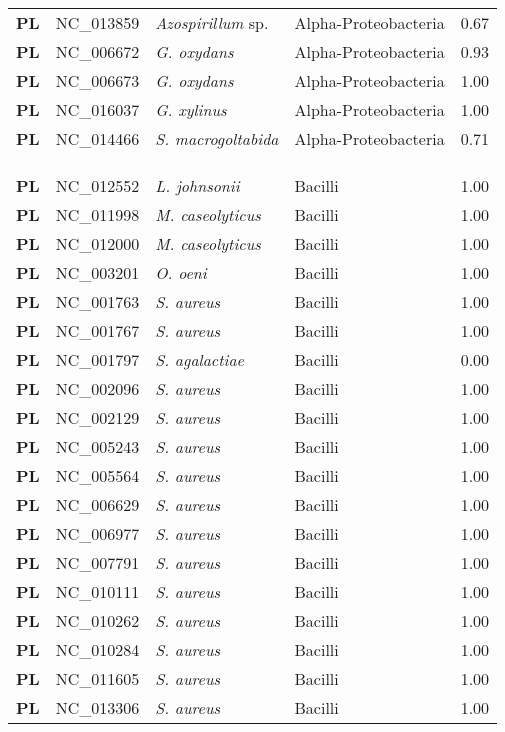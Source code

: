 \begin{adjustwidth}{-3cm}{2cm}
{\begin{supertabular}{>{\bfseries}l|p{0.1\textwidth}p{0.14\textwidth}l|l}
PL & NC\_013859 & \textit{Azospirillum} sp. & Alpha-Proteobacteria & 0.67\\
PL & NC\_006672 & \textit{G. oxydans} & Alpha-Proteobacteria & 0.93\\
PL & NC\_006673 & \textit{G. oxydans} & Alpha-Proteobacteria & 1.00\\
PL & NC\_016037 & \textit{G. xylinus} & Alpha-Proteobacteria & 1.00\\
PL & NC\_014466 & \textit{S. macrogoltabida} & Alpha-Proteobacteria & 0.71\\
\\
\\
\hline\\
PL & NC\_012552 & \textit{L. johnsonii} & Bacilli & 1.00\\
PL & NC\_011998 & \textit{M. caseolyticus} & Bacilli & 1.00\\
PL & NC\_012000 & \textit{M. caseolyticus} & Bacilli & 1.00\\
PL & NC\_003201 & \textit{O. oeni} & Bacilli & 1.00\\
PL & NC\_001763 & \textit{S. aureus} & Bacilli & 1.00\\
PL & NC\_001767 & \textit{S. aureus} & Bacilli & 1.00\\
PL & NC\_001797 & \textit{S. agalactiae} & Bacilli & 0.00\\
PL & NC\_002096 & \textit{S. aureus} & Bacilli & 1.00\\
PL & NC\_002129 & \textit{S. aureus} & Bacilli & 1.00\\
PL & NC\_005243 & \textit{S. aureus} & Bacilli & 1.00\\
PL & NC\_005564 & \textit{S. aureus} & Bacilli & 1.00\\
PL & NC\_006629 & \textit{S. aureus} & Bacilli & 1.00\\
PL & NC\_006977 & \textit{S. aureus} & Bacilli & 1.00\\
PL & NC\_007791 & \textit{S. aureus} & Bacilli & 1.00\\
PL & NC\_010111 & \textit{S. aureus} & Bacilli & 1.00\\
PL & NC\_010262 & \textit{S. aureus} & Bacilli & 1.00\\
PL & NC\_010284 & \textit{S. aureus} & Bacilli & 1.00\\
PL & NC\_011605 & \textit{S. aureus} & Bacilli & 1.00\\
PL & NC\_013306 & \textit{S. aureus} & Bacilli & 1.00\\

\end{supertabular}}
\end{adjustwidth}
